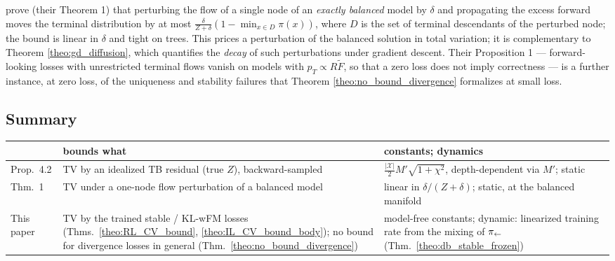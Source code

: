 \citet{silva2025gflownets} prove (their Theorem 1) that perturbing the flow of a single node of an \emph{exactly balanced} model by $\delta$ and propagating the excess forward moves the terminal distribution by at most $\frac{\delta}{Z+\delta}(1-\min_{x\in D}\pi(x))$, where $D$ is the set of terminal descendants of the perturbed node; the bound is linear in $\delta$ and tight on trees. This prices a perturbation of the balanced solution in total variation; it is complementary to Theorem \ref{theo:gd_diffusion}, which quantifies the \emph{decay} of such perturbations under gradient descent. Their Proposition 1 --- forward-looking losses with unrestricted terminal flows vanish on models with $p_T \propto R\tilde F$, so that a zero loss does not imply correctness --- is a further instance, at zero loss, of the uniqueness and stability failures that Theorem \ref{theo:no_bound_divergence} formalizes at small loss.

\subsection{Summary}

\begin{center}
\small
\begin{tabular}{@{}p{}p{}p{}@{}}
\hline
 & bounds what & constants; dynamics \\
\hline
\citet{silvageneralization} Prop.\ 4.2 & TV by an idealized TB residual (true $Z$), backward-sampled & $\frac{|\mathcal X|}{2}M'\sqrt{1+\chi^2}$, depth-dependent via $M'$; static \\[2pt]
\citet{silva2025gflownets} Thm.\ 1 & TV under a one-node flow perturbation of a balanced model & linear in $\delta/(Z+\delta)$; static, at the balanced manifold \\[2pt]
This paper & TV by the trained stable / KL-wFM losses (Thms.\ \ref{theo:RL_CV_bound}, \ref{theo:IL_CV_bound_body}); no bound for divergence losses in general (Thm.\ \ref{theo:no_bound_divergence}) & model-free constants; dynamic: linearized training rate from the mixing of $\pi_{\leftarrow}$ (Thm.\ \ref{theo:db_stable_frozen}) \\
\hline
\end{tabular}
\end{center}
